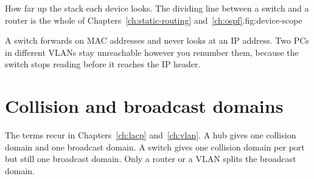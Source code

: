 \begin{utpfig}{How far up the stack each device looks. The dividing
line between a switch and a router is the whole of Chapters~\ref{ch:static-routing}
and~\ref{ch:ospf}.}{fig:device-scope}
\end{utpfig}

\begin{keyidea}
A switch forwards on MAC addresses and never looks at an IP address.
Two PCs in different VLANs stay unreachable however you renumber them,
because the switch stops reading before it reaches the IP header.
\end{keyidea}

\section*{Collision and broadcast domains}
The terms recur in Chapters~\ref{ch:lacp} and~\ref{ch:vlan}. A hub gives
one collision domain and one broadcast domain. A switch gives one
collision domain per port but still one broadcast domain. Only a router
or a VLAN splits the broadcast domain.

